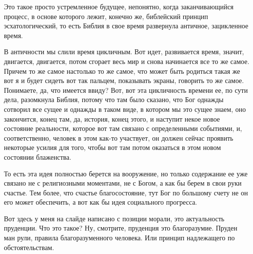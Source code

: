 Это такое просто
устремленное будущее, непонятно, когда заканчивающийся процесс, в основе
которого лежит, конечно же, библейский принцип эсхатологический, то есть Библия
в свое время развернула античное, зацикленное время. 

В античности мы слили время цикличным. Вот идет, развивается время, значит,
двигается, двигается, потом сгорает весь мир и снова начинается все то же самое.
Причем то же самое настолько то же самое, что может быть родиться такая же вот я
и будет сидеть вот так пальцем, показывать экраны, говорить то же самое.
Понимаете, да, что имеется ввиду? Вот, вот эта цикличность времени ее, по сути
дела, разомкнула Библия, потому что там было сказано, что Бог однажды сотворил
все сущее и однажды в таком виде, в котором мы это сущее знаем, оно закончится,
конец там, да, история, конец этого, и наступит некое новое состояние
реальности, которое вот там связано с определенными событиями, и,
соответственно, человек в этом как-то участвует, он должен сейчас проявить
некоторые усилия для того, чтобы вот там потом оказаться в этом новом состоянии
блаженства. 

То есть эта идея полностью берется на вооружение, но только
содержание ее уже связано не с религиозными моментами, не с Богом, а как бы
берем в свои руки счастье. Тем более, что счастье благосостояние, тут Бог по
большому счету не он его может обеспечить, а вот как бы идея социального
прогресса. 

Вот здесь у меня на слайде написано с позиции морали, это
актуальность пруденции. Что это такое? Ну, смотрите, пруденция это благоразумие.
Пруден ман рули, правила благоразуменного человека. Или принцип надлежащего по
обстоятельствам. 

